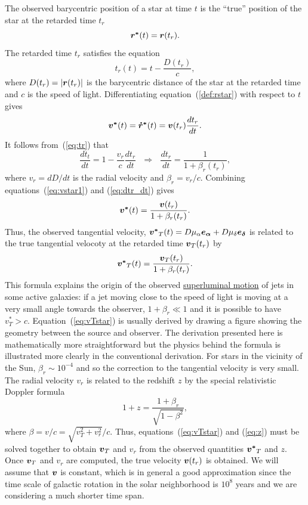 \documentclass[12pt]{article}
\newcommand \beq {\begin{equation}}
\newcommand \eeq {\end{equation}}
\newcommand{\ve}[1]{\mbox{\boldmath $#1$}}
\begin{document}
The observed barycentric position of a star at time $t$ is the ``true'' position 
of the star at the retarded time $t_r$ 
\beq
  \ve{r^*}(t) = \ve{r}(t_r) .
\label{def:rstar}
\eeq
The retarded time $t_r$ satisfies the equation 
\beq
  t_r(t) = t - \frac{D(t_r)}{c} ,
\label{eq:tr}
\eeq
where $D(t_r) = |\ve{r}(t_r)|$ is the barycentric distance of the star 
at the retarded time and $c$ is the speed of light. Differentiating 
equation~(\ref{def:rstar}) with respect 
to $t$ gives 
\beq
  \ve{v^*}(t) = \ve{\dot{r}^*}(t) = \ve{v}(t_r) \frac{d t_r}{dt} .
\label{eq:vstar1}
\eeq
It follows from~(\ref{eq:tr}) that 
\beq
  \frac{dt_t}{dt} = 1-\frac{v_r}{c} \frac{dt_r}{dt} \ \ \ \Rightarrow \ \ \ 
  \frac{dt_r}{dt} = \frac{1}{1+\beta_r(t_r)} ,
\label{eq:dtr_dt}
\eeq
where $v_r = d D/dt$ is the radial velocity and $\beta_r = v_r/c$. Combining 
equations~(\ref{eq:vstar1}) and (\ref{eq:dtr_dt}) gives 
\beq
  \ve{v^*}(t) = \frac{\ve{v}(t_r)}{1+\beta_r(t_r)} .
\eeq
Thus, the observed tangential velocity, $\ve{v^*}_T(t)=D\mu_{\alpha}\ve{e_{\alpha}} 
+ D \mu_{\delta} \ve{e_{\delta}}$ is related to the true 
tangential velocoty at the retarded time $\ve{v}_T(t_r)$ by 
\beq
   \ve{v^*}_T(t) = \frac{\ve{v}_T(t_r)}{1+\beta_r(t_r)} .
\label{eq:vTstar}
\eeq
This formula explains the origin of the observed 
\href{https://en.wikipedia.org/wiki/Superluminal_motion}{superluminal motion} 
of jets in some active galaxies: if a jet moving close to the speed of light 
is moving at a very small angle towards the observer, $1+\beta_r \ll 1$ and 
it is possible to have $v^*_T > c$. Equation~(\ref{eq:vTstar}) is usually derived by 
drawing a figure showing the geometry between the source and observer. 
The derivation presented here is mathematically more straightforward but 
the physics behind the formula is illustrated more clearly in the conventional 
derivation. For stars in the vicinity of the Sun, 
$\beta_r \sim 10^{-4}$ and so the correction to the tangential 
velocity is very small. The radial velocity $v_r$ is related to the redshift $z$ 
by the special relativistic Doppler formula 
\beq
  1 + z = \frac{1+\beta_r}{\sqrt{1-\beta^2}} ,
\label{eq:z}
\eeq
where $\beta = v/c = \sqrt{v_T^2+v_r^2}/c$. Thus, equations~(\ref{eq:vTstar}) 
and (\ref{eq:z}) must be solved together to obtain $\ve{v}_T$ and $v_r$ 
from the observed quantities $\ve{v^*}_T$ and $z$. Once $\ve{v}_T$ and 
$v_r$ are computed, the true velocity $\ve{v}(t_r)$ is obtained. We will assume that 
$\ve{v}$ is constant, which is in general a good approximation since the time scale of 
galactic rotation in the solar neighborhood is $10^8$ years and we are considering 
a much shorter time span.
\end{document}
